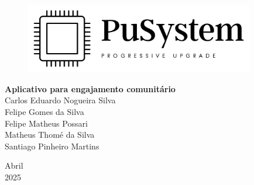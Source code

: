 \documentclass[a4paper, 12pt]{article}
\begin{document}

\begin{titlepage}
	\begin{center}
	
	\begin{figure}[!ht]
	\centering
	\includegraphics[width=10cm]{Logo Transparente Preto.png} \\ 
    \end{figure}

        
		\vspace{115pt}
        \textbf{\Huge{Aplicativo para engajamento comunitário}}\\
        
		\vspace{115pt}
        Carlos Eduardo Nogueira Silva \\
        Felipe Gomes da Silva \\
        Felipe Matheus Possari \\
        Matheus Thomé da Silva\\ 
        Santiago Pinheiro Martins \\
	\end{center}
	
	
	\vspace{1cm}
	\begin{center}
		\vspace{\fill}
		 Abril \\
		 2025
			\end{center}
\end{titlepage}




\newpage
\thispagestyle{empty}
\tableofcontents

\newpage 
\thispagestyle{empty}
\listoffigures

\newpage
\thispagestyle{empty}
\listoftables

\newpage
\pagestyle{fancy}

\fancyhead[L]{\thepage}
\fancyhead[C]{\nouppercase{\leftmark}}
\fancyfoot[R]{}
\fancyfoot[L]{}
\setlength\headheight{26pt}
\end{document}
